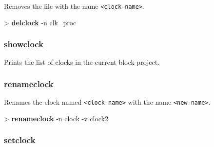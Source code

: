 \documentclass[10pt,a4paper]{article}
\begin{document}
Removes the file with the name \texttt{<clock-name>}.\\


\begin{sampletitle}
> \textbf{\tool{} delclock} -n clk\_proc
\end{sampletitle}


\subsubsection{showclock}
\label{subsec:showclock}

Prints the list of clocks in the current block project.

\subsubsection{renameclock}
\label{subsec:renameclock}

Renames the clock named \texttt{<clock-name>} with the name \texttt{<new-name>}.\\


\begin{sampletitle}
> \textbf{\tool{} renameclock} -n clock -v clock2
\end{sampletitle}


\subsubsection{setclock}
\label{subsec:setclock}
\end{document}
